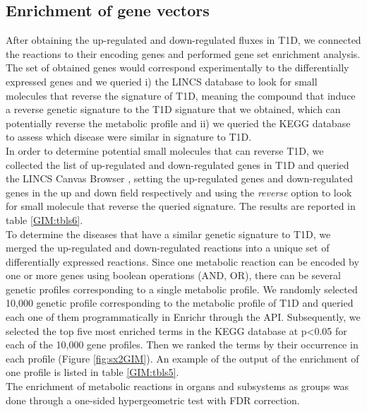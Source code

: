 \subsection{Enrichment of gene vectors}
After obtaining the up-regulated and down-regulated fluxes in T1D, we connected the reactions to their encoding genes and performed gene set enrichment analysis. The set of obtained genes would correspond experimentally to the differentially expressed genes and we queried i) the LINCS database to look for small molecules that reverse the signature of T1D, meaning the compound that induce a reverse genetic signature to the T1D signature that we obtained, which can potentially reverse the metabolic profile and ii) we queried the KEGG database to assess which disease were similar in signature to T1D.\\
In order to determine potential small molecules that can reverse T1D, we collected the list of up-regulated and down-regulated genes in T1D and queried the LINCS Canvas Browser \cite{duan2014lincs}, setting the up-regulated genes and down-regulated genes in the up and down field respectively and using the \textit{reverse} option to look for small molecule that reverse the queried signature. The results are reported in table \ref{GIM:tbls6}.\\
To determine the diseases that have a similar genetic signature to T1D, we merged the up-regulated and down-regulated reactions into a unique set of differentially expressed reactions. Since one metabolic reaction can be encoded by one or more genes using boolean operations (AND, OR), there can be several genetic profiles corresponding to a single metabolic profile. We randomly selected 10,000 genetic profile corresponding to the metabolic profile of T1D and queried each one of them programmatically in Enrichr \cite{chen2013enrichr} through the API. Subsequently, we selected the top five most enriched terms in the KEGG database at p<0.05 for each of the 10,000 gene profiles. Then we ranked the terms by their occurrence in each profile (Figure \ref{fig:sx2GIM}). An example of the output of the enrichment of one profile is listed in table \ref{GIM:tbls5}.\\
The enrichment of metabolic reactions in organs and subsystems as groups was done through a one-sided hypergeometric test with FDR correction. 
